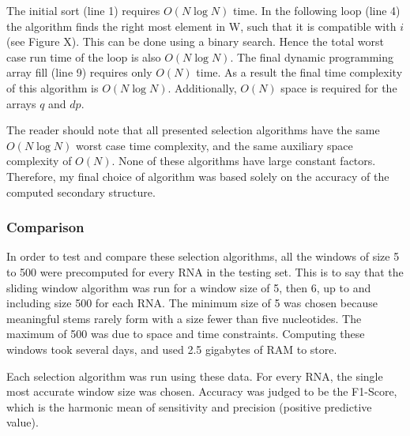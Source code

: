 \documentclass{cshonours}
\begin{document}
The initial sort (line 1) requires $O(N \log N)$ time. In the following loop (line 4) the algorithm finds the right most element in W, such that it is compatible with $i$ (see Figure X). This can be done using a binary search. Hence the total worst case run time of the loop is also $O(N \log N)$. The final dynamic programming array fill (line 9) requires only $O(N)$ time. As a result the final time complexity of this algorithm is $O(N \log N)$. Additionally, $O(N)$ space is required for the arrays $q$ and $dp$.

The reader should note that all presented selection algorithms have the same $O(N \log N)$ worst case time complexity, and the same auxiliary space complexity of $O(N)$. None of these algorithms have large constant factors. Therefore, my final choice of algorithm was based solely on the accuracy of the computed secondary structure.

\subsubsection{Comparison}

In order to test and compare these selection algorithms, all the windows of size 5 to 500 were precomputed for every RNA in the testing set. This is to say that the sliding window algorithm was run for a window size of 5, then 6, up to and including size 500 for each RNA. The minimum size of 5 was chosen because meaningful stems rarely form with a size fewer than five nucleotides. The maximum of 500 was due to space and time constraints. Computing these windows took several days, and used 2.5 gigabytes of RAM to store.

Each selection algorithm was run using these data. For every RNA, the single most accurate window size was chosen. Accuracy was judged to be the F1-Score, which is the harmonic mean of sensitivity and precision (positive predictive value). 




\end{document}
